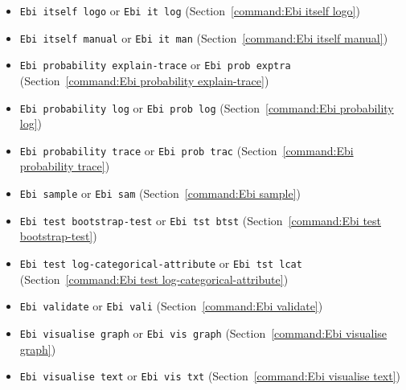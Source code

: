 {\begin{itemize}
\item\texttt{Ebi itself logo} or \texttt{Ebi it log} (Section~\ref{command:Ebi itself logo})
\item\texttt{Ebi itself manual} or \texttt{Ebi it man} (Section~\ref{command:Ebi itself manual})
\item\texttt{Ebi probability explain-trace} or \texttt{Ebi prob exptra} (Section~\ref{command:Ebi probability explain-trace})
\item\texttt{Ebi probability log} or \texttt{Ebi prob log} (Section~\ref{command:Ebi probability log})
\item\texttt{Ebi probability trace} or \texttt{Ebi prob trac} (Section~\ref{command:Ebi probability trace})
\item\texttt{Ebi sample} or \texttt{Ebi sam} (Section~\ref{command:Ebi sample})
\item\texttt{Ebi test bootstrap-test} or \texttt{Ebi tst btst} (Section~\ref{command:Ebi test bootstrap-test})
\item\texttt{Ebi test log-categorical-attribute} or \texttt{Ebi tst lcat} (Section~\ref{command:Ebi test log-categorical-attribute})
\item\texttt{Ebi validate} or \texttt{Ebi vali} (Section~\ref{command:Ebi validate})
\item\texttt{Ebi visualise graph} or \texttt{Ebi vis graph} (Section~\ref{command:Ebi visualise graph})
\item\texttt{Ebi visualise text} or \texttt{Ebi vis txt} (Section~\ref{command:Ebi visualise text})
\end{itemize}}
